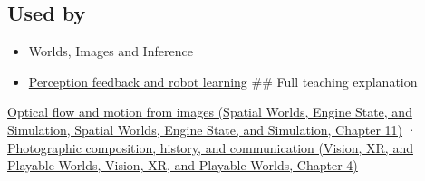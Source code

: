 \subsection{Used by}\label{appendix-e2e73f8cd93e-used-by}

\begin{itemize}
\item
  {Worlds, Images and Inference}
\item
  \hyperref[appendix-b0c42da325f1]{Perception feedback and robot learning} \#\# Full teaching explanation
\end{itemize}

\href{../05-Spatial-Worlds-Engine-State-and-Simulation/main.pdf\#nameddest=04-visual-computing-ii-ch030-optical-flow-and-motion-from-images}{Optical flow and motion from images (Spatial Worlds, Engine State, and Simulation, Spatial Worlds, Engine State, and Simulation, Chapter 11)} · \href{../07-Vision-XR-and-Playable-Worlds/main.pdf\#nameddest=04-visual-computing-ii-ch034-photographic-composition-history-and-communication}{Photographic composition, history, and communication (Vision, XR, and Playable Worlds, Vision, XR, and Playable Worlds, Chapter 4)}
